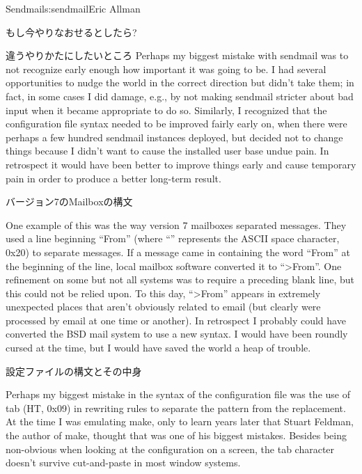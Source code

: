 \begin{aosachapter}{Sendmail}{s:sendmail}{Eric Allman}
\begin{aosasect1}{もし今やりなおせるとしたら?}
\begin{aosasect2}{違うやりかたにしたいところ}
Perhaps my biggest mistake with sendmail was to not recognize early
enough how important it was going to be. I had several opportunities
to nudge the world in the correct direction but didn't take them; in
fact, in some cases I did damage, e.g., by not making sendmail
stricter about bad input when it became appropriate to do
so. Similarly, I recognized that the configuration file syntax needed
to be improved fairly early on, when there were perhaps a few hundred
sendmail instances deployed, but decided not to change things because
I didn't want to cause the installed user base undue pain. In
retrospect it would have been better to improve things early and
cause temporary pain in order to produce a better long-term result.

\begin{aosasect3}{バージョン7のMailboxの構文}

One example of this was the way version 7 mailboxes separated
messages.  They used a line beginning ``From\textvisiblespace'' (where
``\textvisiblespace'' represents the ASCII space character, 0x20) to separate
messages. If a message came in containing the word ``From\textvisiblespace''
at the
beginning of the line, local mailbox software converted it to
``{\textgreater}From\textvisiblespace''.
One refinement on some but not all systems was
to require a preceding blank line, but this could not be relied
upon. To this day, ``{\textgreater}From'' appears in extremely
unexpected places that aren't obviously related to email (but clearly
were processed by email at one time or another). In retrospect I
probably could have converted the BSD mail system to use a new syntax.
I would have been roundly cursed at the time, but I would have saved
the world a heap of trouble.

\end{aosasect3}

\begin{aosasect3}{設定ファイルの構文とその中身}

Perhaps my biggest mistake in the syntax of the configuration file was
the use of tab (HT, 0x09) in rewriting rules
to separate the pattern from the
replacement.  At the time I was emulating make, only to learn years
later that Stuart Feldman, the author of make, thought that was one of
his biggest mistakes. Besides being non-obvious when looking at the
configuration on a screen, the tab character doesn't survive
cut-and-paste in most window systems.


\end{aosasect3}
\end{aosasect2}
\end{aosasect1}
\end{aosachapter}
